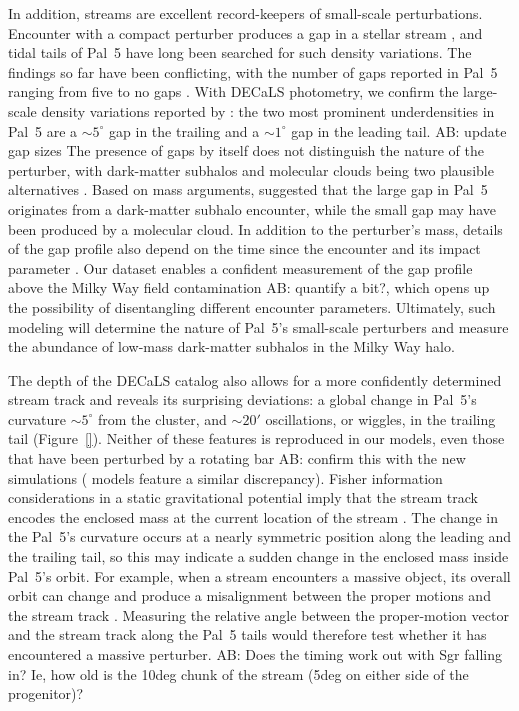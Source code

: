 \documentclass[twocolumn]{aastex62}
\newcommand{\ab}[1]{{\color{teal} AB: #1}}
\begin{document}
In addition, streams are excellent record-keepers of small-scale perturbations.
Encounter with a compact perturber produces a gap in a stellar stream \citep[e.g.,][]{Johnston:2002,Ibata:2002}, and tidal tails of Pal~5 have long been searched for such density variations.
The findings so far have been conflicting, with the number of gaps reported in Pal~5 ranging from five \citep{Carlberg:2012} to no gaps \citep{Ibata:2016}.
With DECaLS photometry, we confirm the large-scale density variations reported by \citet{Erkal:2017}: the two most prominent underdensities in Pal~5 are a $\sim5^\circ$ gap in the trailing and a $\sim1^\circ$ gap in the leading tail. 
\ab{update gap sizes}
The presence of gaps by itself does not distinguish the nature of the perturber, with dark-matter subhalos and molecular clouds being two plausible alternatives \citep[e.g.,][]{Yoon:2011,Amorisco:2016}.
Based on mass arguments, \citet{Erkal:2017} suggested that the large gap in Pal~5 originates from a dark-matter subhalo encounter, while the small gap may have been produced by a molecular cloud.
In addition to the perturber's mass, details of the gap profile also depend on the time since the encounter and its impact parameter \citep{Erkal:2015}.
Our dataset enables a confident measurement of the gap profile above the Milky Way field contamination \ab{quantify a bit?}, which opens up the possibility of disentangling different encounter parameters.
Ultimately, such modeling will determine the nature of Pal~5's small-scale perturbers and measure the abundance of low-mass dark-matter subhalos in the Milky Way halo.

The depth of the DECaLS catalog also allows for a more confidently determined stream track and reveals its surprising deviations: a global change in Pal~5's curvature $\sim5^\circ$ from the cluster, and $\sim20'$ oscillations, or wiggles, in the trailing tail (Figure~\ref{}).
Neither of these features is reproduced in our models, even those that have been perturbed by a rotating bar \ab{confirm this with the new simulations} (\citealt{Erkal:2017} models feature a similar discrepancy).
Fisher information considerations in a static gravitational potential imply that the stream track encodes the enclosed mass at the current location of the stream \citep{Bonaca:2018}.
The change in the Pal~5's curvature occurs at a nearly symmetric position along the leading and the trailing tail, so this may indicate a sudden change in the enclosed mass inside Pal~5's orbit.
For example, when a stream encounters a massive object, its overall orbit can change and produce a misalignment between the proper motions and the stream track \citep{Erkal:2018, Koposov:2019}.
Measuring the relative angle between the proper-motion vector and the stream track along the Pal~5 tails would therefore test whether it has encountered a massive perturber.
\ab{Does the timing work out with Sgr falling in? Ie, how old is the 10deg chunk of the stream (5deg on either side of the progenitor)?}
\end{document}
